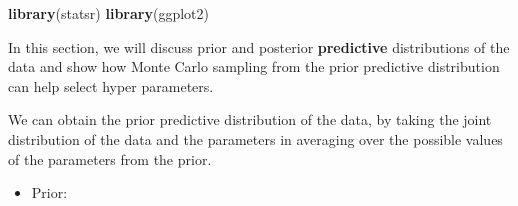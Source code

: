\documentclass[]{book}
\newenvironment{Shaded}{\begin{snugshade}}{\end{snugshade}}
\newcommand{\KeywordTok}[1]{\textcolor[rgb]{0.13,0.29,0.53}{\textbf{{#1}}}}
\newcommand{\DecValTok}[1]{\textcolor[rgb]{0.00,0.00,0.81}{{#1}}}
\newcommand{\FloatTok}[1]{\textcolor[rgb]{0.00,0.00,0.81}{{#1}}}
\newcommand{\StringTok}[1]{\textcolor[rgb]{0.31,0.60,0.02}{{#1}}}
\newcommand{\NormalTok}[1]{{#1}}
\providecommand{\tightlist}{%
  \setlength{\itemsep}{0pt}\setlength{\parskip}{0pt}}
\theoremstyle{definition}
\theoremstyle{definition}
\theoremstyle{definition}
\theoremstyle{remark}
\begin{document}
\begin{Shaded}
\end{Shaded}

\begin{Shaded}
\begin{Highlighting}[]
\KeywordTok{library}\NormalTok{(statsr)}
\KeywordTok{library}\NormalTok{(ggplot2)}
\end{Highlighting}
\end{Shaded}

In this section, we will discuss prior and posterior \textbf{predictive}
distributions of the data and show how Monte Carlo sampling from the
prior predictive distribution can help select hyper parameters.

We can obtain the prior predictive distribution of the data, by taking
the joint distribution of the data and the parameters in averaging over
the possible values of the parameters from the prior.

\begin{itemize}
\tightlist
\item
  Prior:
\end{itemize}
\end{document}
